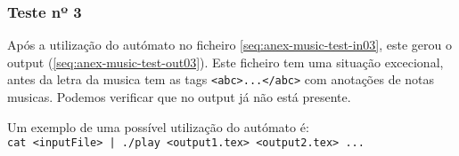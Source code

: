 \subsubsection{Teste nº 3}

Após a utilização do autómato no ficheiro \ref{seq:anex-music-test-in03}, este gerou o output (\ref{seq:anex-music-test-out03}).
Este ficheiro tem uma situação excecional, antes da letra da musica tem as tags \verb!<abc>...</abc>! com anotações de notas musicas.
Podemos verificar que no output já não está presente.


Um exemplo de uma possível utilização do autómato é:\\
\verb!cat <inputFile> | ./play <output1.tex> <output2.tex> ...!

